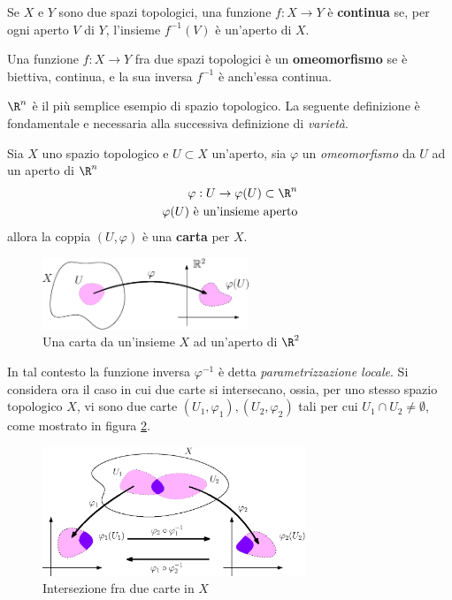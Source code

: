\documentclass[10pt, letterpaper]{report}
\begin{document}
\begin{definizione}
    Se $X$ e $Y$ sono due spazi topologici, una funzione $f:X\rightarrow Y$ è \textbf{continua} se, per ogni aperto $V$ di $Y$, l'insieme $f^{-1}(V)$ è un'aperto di $X$.
\end{definizione}
\begin{definizione}
    Una funzione $f:X\rightarrow Y$ fra due spazi topologici è un \textbf{omeomorfismo} se è biettiva, continua, e la sua inversa $f^{-1}$ è anch'essa continua.
\end{definizione}
$\R^n$ è il più semplice esempio di spazio topologico.
La seguente definizione è fondamentale e necessaria alla successiva definizione di \textit{varietà}.
\begin{definizione}
    Sia $X$ uno spazio topologico e $U\subset X$ un'aperto, sia $\varphi$ un \textit{omeomorfismo} da $U$ ad un aperto di $\R^n$\begin{eqnarray}
        \varphi:U\rightarrow\varphi(U)\subset \R^n\\ 
        \varphi(U) \text{ è un'insieme aperto}
    \end{eqnarray}
    allora la coppia $(U,\varphi)$ è una \textbf{carta} per $X$.
\end{definizione}
\begin{figure}[h!]
    \center
    \includegraphics[width=0.55\textwidth ]{images/carta.eps}
    \caption{Una carta da un'insieme $X$ ad un'aperto di $\R^2$}
    \label{img:carta}
\end{figure}
In tal contesto la funzione inversa $\varphi^{-1}$ è detta \textit{parametrizzazione locale}. Si considera ora il caso in cui due carte si intersecano, ossia, per uno stesso spazio topologico $X$, vi sono due carte $(U_1,\varphi_1),(U_2,\varphi_2)$ tali per cui $U_1\cap U_2\ne\emptyset$, come mostrato in figura \ref{img:intersezione_carte}.
\begin{figure}[h!]
    \center
    \includegraphics[width=0.7\textwidth ]{images/intersezione_carte.eps}
    \caption{Intersezione fra due carte in $X$}
    \label{img:intersezione_carte}
\end{figure}
\end{document}

